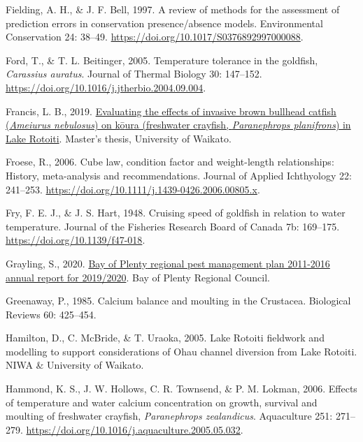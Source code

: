 \documentclass[
  letterpaper,
  DIV=11,
  numbers=noendperiod]{scrartcl}
\newlength{\cslhangindent}
\newenvironment{CSLReferences}[2] %
 {\begin{list}{}{%
  \setlength{\itemindent}{0pt}
  \setlength{\leftmargin}{0pt}
  \setlength{\parsep}{0pt}
  \ifodd #1
   \setlength{\leftmargin}{\cslhangindent}
   \setlength{\itemindent}{-1\cslhangindent}
  \fi
  \setlength{\itemsep}{#2\baselineskip}}}
 {\end{list}}
\begin{document}
\begin{CSLReferences}{0}{1}
Fielding, A. H., \& J. F. Bell, 1997. A review of methods for the
assessment of prediction errors in conservation presence/absence models.
Environmental Conservation 24: 38--49.
\url{https://doi.org/10.1017/S0376892997000088}.

Ford, T., \& T. L. Beitinger, 2005. Temperature tolerance in the
goldfish, {\emph{Carassius auratus}}. Journal of Thermal Biology 30:
147--152. \url{https://doi.org/10.1016/j.jtherbio.2004.09.004}.

Francis, L. B., 2019.
\href{https://researchcommons.waikato.ac.nz/handle/10289/12746}{Evaluating
the effects of invasive brown bullhead catfish ({\emph{Ameiurus
nebulosus}}) on k{ō}ura (freshwater crayfish, {\emph{Paranephrops
planifrons}}) in {Lake Rotoiti}}. Master's thesis, University of
Waikato.

Froese, R., 2006. Cube law, condition factor and weight-length
relationships: History, meta-analysis and recommendations. Journal of
Applied Ichthyology 22: 241--253.
\url{https://doi.org/10.1111/j.1439-0426.2006.00805.x}.

Fry, F. E. J., \& J. S. Hart, 1948. Cruising speed of goldfish in
relation to water temperature. Journal of the Fisheries Research Board
of Canada 7b: 169--175. \url{https://doi.org/10.1139/f47-018}.

Grayling, S., 2020.
\href{https://atlas.boprc.govt.nz/api/v1/edms/document/A3651696/content}{{Bay
of Plenty} regional pest management plan 2011-2016 annual report for
2019/2020}. Bay of Plenty Regional Council.

Greenaway, P., 1985. Calcium balance and moulting in the {Crustacea}.
Biological Reviews 60: 425--454.

Hamilton, D., C. McBride, \& T. Uraoka, 2005. {Lake Rotoiti} fieldwork
and modelling to support considerations of {Ohau} channel diversion from
{Lake Rotoiti}. NIWA \& University of Waikato.

Hammond, K. S., J. W. Hollows, C. R. Townsend, \& P. M. Lokman, 2006.
Effects of temperature and water calcium concentration on growth,
survival and moulting of freshwater crayfish, {\emph{Paranephrops
zealandicus}}. Aquaculture 251: 271--279.
\url{https://doi.org/10.1016/j.aquaculture.2005.05.032}.


\end{CSLReferences}
\end{document}
